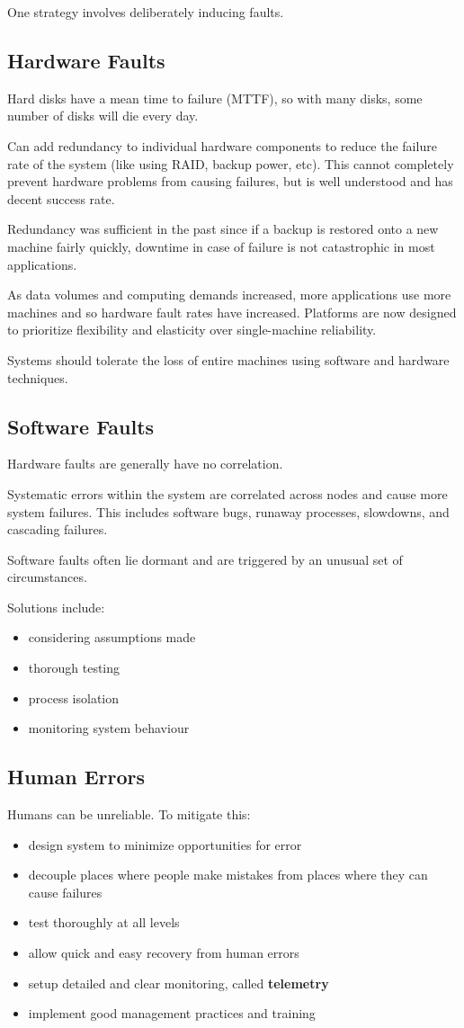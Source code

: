 \documentclass[11pt]{article}
\begin{document}
One strategy involves deliberately inducing faults.
\subsection{Hardware Faults}
\label{sec:org745665b}
Hard disks have a mean time to failure (MTTF), so with many disks, some number of disks will die every day.

Can add redundancy to individual hardware components to reduce the failure rate of the system (like using
RAID, backup power, etc).
This cannot completely prevent hardware problems from causing failures, but is well understood and has
decent success rate.

Redundancy was sufficient in the past since if a backup is restored onto a new machine fairly quickly,
downtime in case of failure is not catastrophic in most applications.

As data volumes and computing demands increased, more applications use more machines and so hardware
fault rates have increased.
Platforms are now designed to prioritize flexibility and elasticity over single-machine reliability.

Systems should tolerate the loss of entire machines using software and hardware techniques.
\subsection{Software Faults}
\label{sec:org8024529}
Hardware faults are generally have no correlation.

Systematic errors within the system are correlated across nodes and cause more system failures.
This includes software bugs, runaway processes, slowdowns, and cascading failures.

Software faults often lie dormant and are triggered by an unusual set of circumstances.

Solutions include:
\begin{itemize}
\item considering assumptions made
\item thorough testing
\item process isolation
\item monitoring system behaviour
\end{itemize}
\subsection{Human Errors}
\label{sec:org28452e2}
Humans can be unreliable. To mitigate this:
\begin{itemize}
\item design system to minimize opportunities for error
\item decouple places where people make mistakes from places where they can cause failures
\item test thoroughly at all levels
\item allow quick and easy recovery from human errors
\item setup detailed and clear monitoring, called \textbf{telemetry}
\item implement good management practices and training
\end{itemize}
\end{document}
